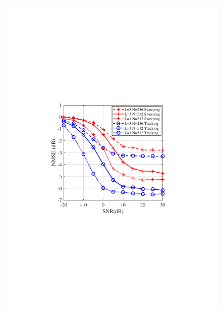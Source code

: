 \documentclass[journal,12pt,onecolumn,draftclsnofoot,]{IEEEtran}
\begin{document}
\begin{figure}
{\hspace{-4.5mm}\includegraphics[scale=0.46]{6-2.pdf}\hspace{-5mm}
}
\quad
\subfloat[]{
}
\end{figure}
\end{document}
